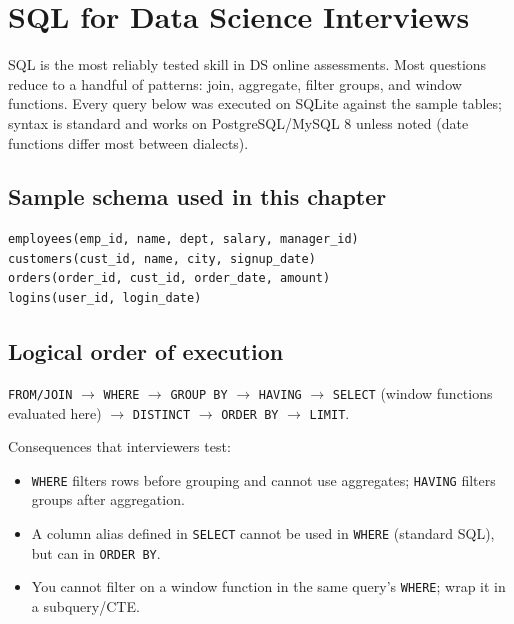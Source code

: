 \chapter{SQL for Data Science Interviews}

SQL is the most reliably tested skill in DS online assessments. Most questions reduce to a handful of patterns: join, aggregate, filter groups, and window functions. Every query below was executed on SQLite against the sample tables; syntax is standard and works on PostgreSQL/MySQL 8 unless noted (date functions differ most between dialects).

\section{Sample schema used in this chapter}
\begin{lstlisting}[style=sql]
employees(emp_id, name, dept, salary, manager_id)
customers(cust_id, name, city, signup_date)
orders(order_id, cust_id, order_date, amount)
logins(user_id, login_date)
\end{lstlisting}

\section{Logical order of execution}
\texttt{FROM/JOIN} $\to$ \texttt{WHERE} $\to$ \texttt{GROUP BY} $\to$ \texttt{HAVING} $\to$ \texttt{SELECT} (window functions evaluated here) $\to$ \texttt{DISTINCT} $\to$ \texttt{ORDER BY} $\to$ \texttt{LIMIT}.

Consequences that interviewers test:
\begin{itemize}
  \item \texttt{WHERE} filters rows before grouping and cannot use aggregates; \texttt{HAVING} filters groups after aggregation.
  \item A column alias defined in \texttt{SELECT} cannot be used in \texttt{WHERE} (standard SQL), but can in \texttt{ORDER BY}.
  \item You cannot filter on a window function in the same query's \texttt{WHERE}; wrap it in a subquery/CTE.
\end{itemize}

